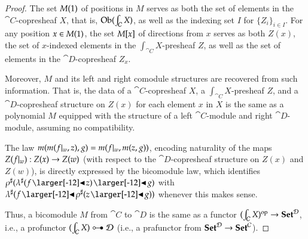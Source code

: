 \documentclass{amsart}
\begin{document}
\begin{proof}
  The set $M(1)$ of positions in $M$ serves as both the set of
  elements in the $\cat{C}$-copresheaf $X$, that is,
  $\operatorname{Ob}(\int_{\mathcal{C}}X)$, as well as the indexing set $I$ for
  $\{Z_i\}_{i \in I}$. For any position $x \in M(1)$, the set
  $M[x]$ of directions from $x$ serves as both $Z(x)$, the set of
  $x$-indexed elements in the $\int_{\cat{C}}X$-presheaf $Z$, as well
  as the set of elements in the $\cat{D}$-copresheaf $Z_x$.

  Moreover, $M$ and its left and right comodule structures are recovered
  from such information. That is, the data of a $\cat{C}$-copresheaf
  $X$, a $\int_{\cat{C}}X$-presheaf $Z$, and a $\cat{D}$-copresheaf
  structure on $Z(x)$ for each element $x$ in $X$ is the same as a
  polynomial $M$ equipped with the structure of a left
  $\cat{C}$-module and right $\cat{D}$-module, assuming no
  compatibility.

  The law $m(m(f|_{w}, z), g) = m(f|_{w}, m(z, g))$, encoding naturality
  of the maps $Z(f|_{w}): Z(x) \to Z(w)$ (with respect to the
  $\cat{D}$-copresheaf structure on $Z(x)$ and $Z(w)$), is directly
  expressed by the bicomodule law, which identifies
  $\anydirmapof{\rho}{\anydirmapof{\lambda}{f \subd z} \subd g}$ with
  $\anydirmapof{\lambda}{f \subd \anydirmapof{\rho}{z \subd g}}$ whenever
  this makes sense.

  Thus, a bicomodule $M$ from $\cat{C}$ to $\cat{D}$ is the same as a
  functor $(\int_{\mathcal{C}} X)^{\mathrm{op}} \to {\normalfont\mathbf{Set}}^{\mathcal{D}}$, i.e., a profunctor
  $(\int_{\cat{C}} X) \prof \cat{D}$ (i.e., a prafunctor from
  ${\normalfont\mathbf{Set}}^{\mathcal{D}} \to {\normalfont\mathbf{Set}}^{\mathcal{C}}$).
\end{proof}
\end{document}
